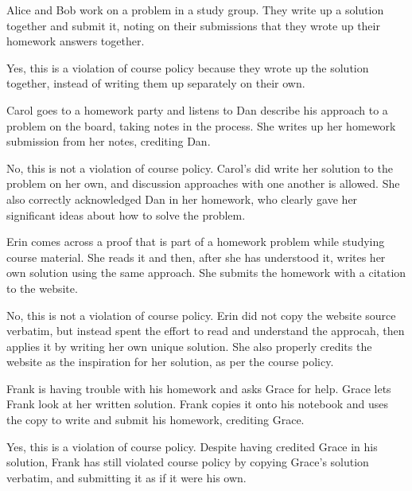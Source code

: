 \documentclass[11pt]{article}
\begin{document}
\begin{Parts}
  \Part Alice and Bob work on a problem in a study group. They write up a solution together and submit it, noting on their submissions that they wrote up their homework answers together.
  
  \begin{solution}
    Yes, this is a violation of course policy because they wrote up the solution together, instead of writing them up separately on their own.
  \end{solution}
  \Part Carol goes to a homework party and listens to Dan describe his approach to a problem on the board, taking notes in the process. She writes up her homework submission from her notes, crediting Dan.

  \begin{solution}
    No, this is not a violation of course policy. Carol's did write her solution to the problem on her own, and discussion approaches with one another is allowed. She also correctly acknowledged Dan in her homework, who clearly gave her significant ideas about how to solve the problem.
  \end{solution}
  
  \Part Erin comes across a proof that is part of a homework problem while studying course material. She reads it and then, after she has understood it, writes her own solution using the same approach. She submits the homework with a citation to the website.

  \begin{solution}
    No, this is not a violation of course policy. Erin did not copy the website source verbatim, but instead spent the effort to read and understand the approcah, then applies it by writing her own unique solution. She also properly credits the website as the inspiration for her solution, as per the course policy.
  \end{solution}
  
  
  \Part Frank is having trouble with his homework and asks Grace for help. Grace lets Frank look at her written solution. Frank copies it onto his notebook and uses the copy to write and submit his homework, crediting Grace.
  
  \begin{solution}
    Yes, this is a violation of course policy. Despite having credited Grace in his solution, Frank has still violated course policy by copying Grace's solution verbatim, and submitting it as if it were his own.
  \end{solution}
  

\end{Parts}
\end{document}
